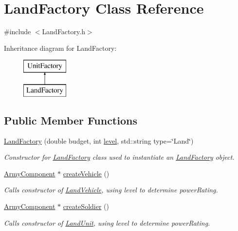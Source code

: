 \hypertarget{class_land_factory}{}\section{Land\+Factory Class Reference}
\label{class_land_factory}


{\ttfamily \#include $<$Land\+Factory.\+h$>$}

Inheritance diagram for Land\+Factory\+:\begin{figure}[H]
\begin{center}
\leavevmode
\includegraphics[height=2.000000cm]{class_land_factory}
\end{center}
\end{figure}
\subsection*{Public Member Functions}
\begin{DoxyCompactItemize}
\item 
\mbox{\hyperlink{class_land_factory_a6863eabc4fe2248aff95aa82b8ce0e16}{Land\+Factory}} (double budget, int \mbox{\hyperlink{class_unit_factory_ac8b73a1ed9adc43991450eb9aed0d40a}{level}}, std\+::string type=\char`\"{}Land\char`\"{})
\begin{DoxyCompactList}\small\item\em Constructor for \mbox{\hyperlink{class_land_factory}{Land\+Factory}} class used to instantiate an \mbox{\hyperlink{class_land_factory}{Land\+Factory}} object. \end{DoxyCompactList}\item 
\mbox{\hyperlink{class_army_component}{Army\+Component}} $\ast$ \mbox{\hyperlink{class_land_factory_a6f1a99f8b975ca829a188f862060fdcf}{create\+Vehicle}} ()
\begin{DoxyCompactList}\small\item\em Calls constructor of \mbox{\hyperlink{class_land_vehicle}{Land\+Vehicle}}, using level to determine power\+Rating. \end{DoxyCompactList}\item 
\mbox{\hyperlink{class_army_component}{Army\+Component}} $\ast$ \mbox{\hyperlink{class_land_factory_a4a5150ab9c2a8b50922c9dbf39bd7214}{create\+Soldier}} ()
\begin{DoxyCompactList}\small\item\em Calls constructor of \mbox{\hyperlink{class_land_unit}{Land\+Unit}}, using level to determine power\+Rating. \end{DoxyCompactList}\end{DoxyCompactItemize}
